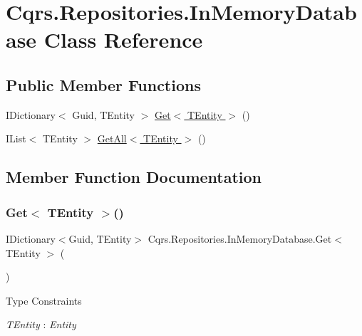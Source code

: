 \hypertarget{classCqrs_1_1Repositories_1_1InMemoryDatabase}{}\section{Cqrs.\+Repositories.\+In\+Memory\+Database Class Reference}
\label{classCqrs_1_1Repositories_1_1InMemoryDatabase}
\subsection*{Public Member Functions}
\begin{DoxyCompactItemize}
\item 
I\+Dictionary$<$ Guid, T\+Entity $>$ \hyperlink{classCqrs_1_1Repositories_1_1InMemoryDatabase_aef212725bb71dfe3a380de20843ed0e5}{Get$<$ T\+Entity $>$} ()
\item 
I\+List$<$ T\+Entity $>$ \hyperlink{classCqrs_1_1Repositories_1_1InMemoryDatabase_a83104b325c203f6768bb8ffd2c9c3381}{Get\+All$<$ T\+Entity $>$} ()
\end{DoxyCompactItemize}


\subsection{Member Function Documentation}
\mbox{\label{classCqrs_1_1Repositories_1_1InMemoryDatabase_aef212725bb71dfe3a380de20843ed0e5}} 
\subsubsection{\texorpdfstring{Get$<$ T\+Entity $>$()}{Get< TEntity >()}}
{\footnotesize\ttfamily I\+Dictionary$<$Guid, T\+Entity$>$ Cqrs.\+Repositories.\+In\+Memory\+Database.\+Get$<$ T\+Entity $>$ (\begin{DoxyParamCaption}{ }\end{DoxyParamCaption})}

\begin{Desc}
\item[Type Constraints]\begin{description}
\item[{\em T\+Entity} : {\em Entity}]\end{description}
\end{Desc}
\mbox{\label{classCqrs_1_1Repositories_1_1InMemoryDatabase_a83104b325c203f6768bb8ffd2c9c3381}} 

